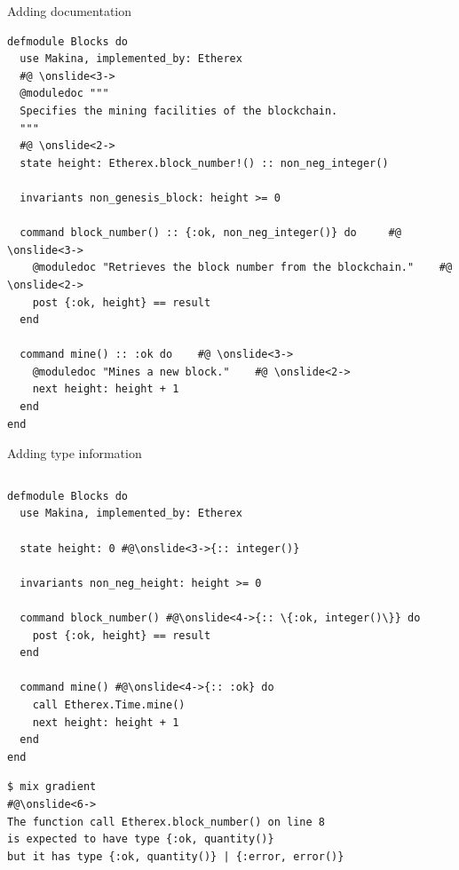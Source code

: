 \documentclass[aspectratio=169, 10pt]{beamer}
\begin{document}
\begin{frame}[label={sec:org5b98973},fragile]{Adding documentation}
 \onslide<+->
\onslide<+->
\lstset{language=elixir,label= ,caption= ,captionpos=b,numbers=none,style=display}
\begin{lstlisting}
defmodule Blocks do
  use Makina, implemented_by: Etherex
  #@ \onslide<3->
  @moduledoc """
  Specifies the mining facilities of the blockchain.
  """
  #@ \onslide<2->
  state height: Etherex.block_number!() :: non_neg_integer()

  invariants non_genesis_block: height >= 0

  command block_number() :: {:ok, non_neg_integer()} do     #@ \onslide<3->
    @moduledoc "Retrieves the block number from the blockchain."    #@ \onslide<2->
    post {:ok, height} == result
  end

  command mine() :: :ok do    #@ \onslide<3->
    @moduledoc "Mines a new block."    #@ \onslide<2->
    next height: height + 1
  end
end
\end{lstlisting}
\end{frame}

\begin{frame}[label={sec:orgc9d94e7},fragile]{Adding type information}
 \begin{columns}
\begin{column}{0.58\columnwidth}
\onslide<+->
\onslide<+->
\lstset{language=elixir,label= ,caption= ,captionpos=b,numbers=none,style=display, numbers=left}
\begin{lstlisting}
defmodule Blocks do
  use Makina, implemented_by: Etherex

  state height: 0 #@\onslide<3->{:: integer()}

  invariants non_neg_height: height >= 0

  command block_number() #@\onslide<4->{:: \{:ok, integer()\}} do
    post {:ok, height} == result
  end

  command mine() #@\onslide<4->{:: :ok} do
    call Etherex.Time.mine()
    next height: height + 1
  end
end
\end{lstlisting}
\lstset{language=bash,label= ,caption= ,captionpos=b,numbers=none,style=shell}
\begin{lstlisting}
$ mix gradient
#@\onslide<6->
The function call Etherex.block_number() on line 8
is expected to have type {:ok, quantity()}
but it has type {:ok, quantity()} | {:error, error()}
\end{lstlisting}
\end{column}
\end{columns}
\end{frame}
\end{document}
